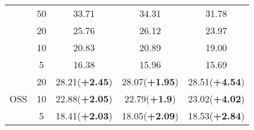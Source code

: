 \documentclass[10pt,twocolumn,letterpaper]{article}
\begin{document}
\begin{table}[h]
\begin{tabular}{cc|ccc}
& \textcolor[rgb]{0.2,0.2,0.2}{50}  & \textcolor[rgb]{0.2,0.2,0.2}{33.71}                                                        & \textcolor[rgb]{0.2,0.2,0.2}{34.31}                                                        & \textcolor[rgb]{0.2,0.2,0.2}{31.78}                                                         \\
                                                        & \textcolor[rgb]{0.2,0.2,0.2}{20}  & \textcolor[rgb]{0.2,0.2,0.2}{25.76}                                                        & \textcolor[rgb]{0.2,0.2,0.2}{26.12}                                                        & \textcolor[rgb]{0.2,0.2,0.2}{23.97}                                                         \\
                                                        & \textcolor[rgb]{0.2,0.2,0.2}{10}  & \textcolor[rgb]{0.2,0.2,0.2}{20.83}                                                        & \textcolor[rgb]{0.2,0.2,0.2}{20.89}                                                        & \textcolor[rgb]{0.2,0.2,0.2}{19.00}                                                         \\
                                                        & \textcolor[rgb]{0.2,0.2,0.2}{5}   & \textcolor[rgb]{0.2,0.2,0.2}{16.38}                                                        & \textcolor[rgb]{0.2,0.2,0.2}{15.96}                                                        & \textcolor[rgb]{0.2,0.2,0.2}{15.69}                                                         \\ 
\hline
\multirow{3}{*}{\textcolor[rgb]{0.2,0.2,0.2}{OSS}}     & \textcolor[rgb]{0.2,0.2,0.2}{20}  & \textcolor[rgb]{0.2,0.2,0.2}{28.21(\textbf{+}}\textcolor[rgb]{0.2,0.2,0.2}{\textbf{2.45})} & \textcolor[rgb]{0.2,0.2,0.2}{28.07(\textbf{+}}\textcolor[rgb]{0.2,0.2,0.2}{\textbf{1.95})} & \textcolor[rgb]{0.2,0.2,0.2}{28.51(\textbf{+}}\textcolor[rgb]{0.2,0.2,0.2}{\textbf{4.54})}  \\
                                                        & \textcolor[rgb]{0.2,0.2,0.2}{10}  & \textcolor[rgb]{0.2,0.2,0.2}{22.88(\textbf{+2}}\textcolor[rgb]{0.2,0.2,0.2}{\textbf{.05})} & \textcolor[rgb]{0.2,0.2,0.2}{22.79(\textbf{+}}\textcolor[rgb]{0.2,0.2,0.2}{\textbf{1.9})}  & \textcolor[rgb]{0.2,0.2,0.2}{23.02(\textbf{+}}\textcolor[rgb]{0.2,0.2,0.2}{\textbf{4.02})}  \\
                                                        & \textcolor[rgb]{0.2,0.2,0.2}{5}   & \textcolor[rgb]{0.2,0.2,0.2}{18.41(\textbf{+}}\textcolor[rgb]{0.2,0.2,0.2}{\textbf{2.03})} & \textcolor[rgb]{0.2,0.2,0.2}{18.05(\textbf{+}}\textcolor[rgb]{0.2,0.2,0.2}{\textbf{2.09})} & \textcolor[rgb]{0.2,0.2,0.2}{18.53(\textbf{+}}\textcolor[rgb]{0.2,0.2,0.2}{\textbf{2.84})}  \\

\end{tabular}
\end{table}
\end{document}
